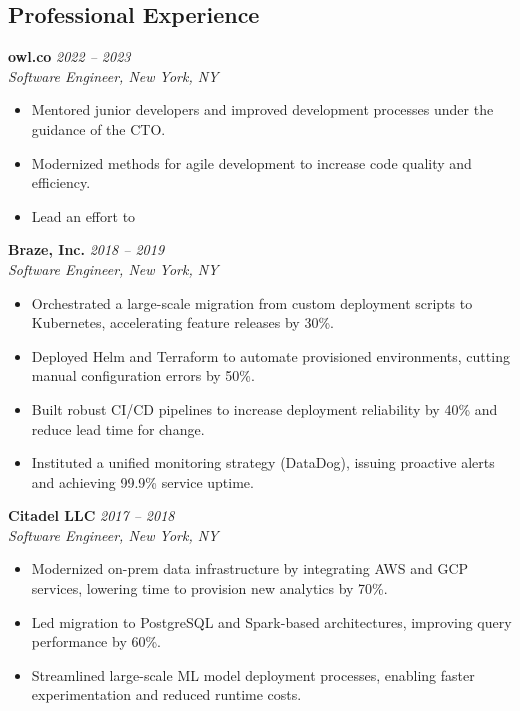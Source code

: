 \documentclass[margin,line]{resume}
\begin{document}
\begin{resume}
\vspace{10pt}

\section{Professional Experience}

\filbreak
\textbf{owl.co} \hfill \textit{2022 -- 2023}\\
\textit{Software Engineer, New York, NY}

\begin{itemize}
    \item Mentored junior developers and improved development processes under the guidance of the CTO.
    \item Modernized methods for agile development to increase code quality and efficiency.
    \item Lead an effort to 
\end{itemize}

\filbreak
\textbf{Braze, Inc.} \hfill \textit{2018 -- 2019}\\
\textit{Software Engineer, New York, NY}

\begin{itemize}
    \item Orchestrated a large-scale migration from custom deployment scripts to Kubernetes, accelerating feature releases by 30\%.
    \item Deployed Helm and Terraform to automate provisioned environments, cutting manual configuration errors by 50\%.
    \item Built robust CI/CD pipelines to increase deployment reliability by 40\% and reduce lead time for change.
    \item Instituted a unified monitoring strategy (DataDog), issuing proactive alerts and achieving 99.9\% service uptime.
\end{itemize}

\filbreak
\textbf{Citadel LLC} \hfill \textit{2017 -- 2018}\\
\textit{Software Engineer, New York, NY}

\begin{itemize}
    \item Modernized on-prem data infrastructure by integrating AWS and GCP services, lowering time to provision new analytics by 70\%.
    \item Led migration to PostgreSQL and Spark-based architectures, improving query performance by 60\%.
    \item Streamlined large-scale ML model deployment processes, enabling faster experimentation and reduced runtime costs.
\end{itemize}


\end{resume}
\end{document}
